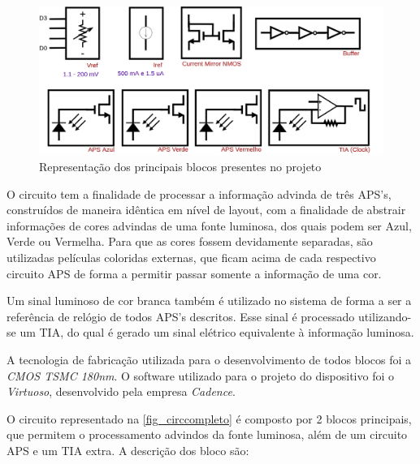 \begin{figure}[!h]
	\caption{\label{fig_circcompletohigh}Representação dos principais blocos presentes no projeto}
	\begin{center}
	    \includegraphics[width=\textwidth]{Imagens/Complete_Circuit_rep.png}
	\end{center}
\end{figure}


O circuito tem a finalidade de processar a informação advinda de tr\^es APS's, constru\'idos de maneira id\^entica em n\'ivel de layout, com a finalidade de abstrair informações de cores advindas de uma fonte luminosa, dos quais podem ser Azul, Verde ou Vermelha. Para que as cores fossem devidamente separadas, são utilizadas películas coloridas externas, que ficam acima de cada respectivo circuito APS de forma a permitir passar somente a informação de uma cor.

Um sinal luminoso de cor branca tamb\'em \'e utilizado no sistema de forma a ser a refer\^encia de rel\'ogio de todos APS's descritos. Esse sinal \'e processado utilizando-se um TIA, do qual \'e gerado um sinal el\'etrico equivalente \`a informação luminosa.

A tecnologia de fabricação utilizada para o desenvolvimento de todos blocos foi a \textit{CMOS TSMC 180nm}. O software utilizado para o projeto do dispositivo foi o \textit{Virtuoso}, desenvolvido pela empresa \textit{Cadence}.

O circuito representado na \autoref{fig_circcompleto} \'e composto por 2 blocos principais, que permitem o processamento advindos da fonte luminosa, al\'em de um circuito APS e um TIA extra. A descrição dos bloco são:

